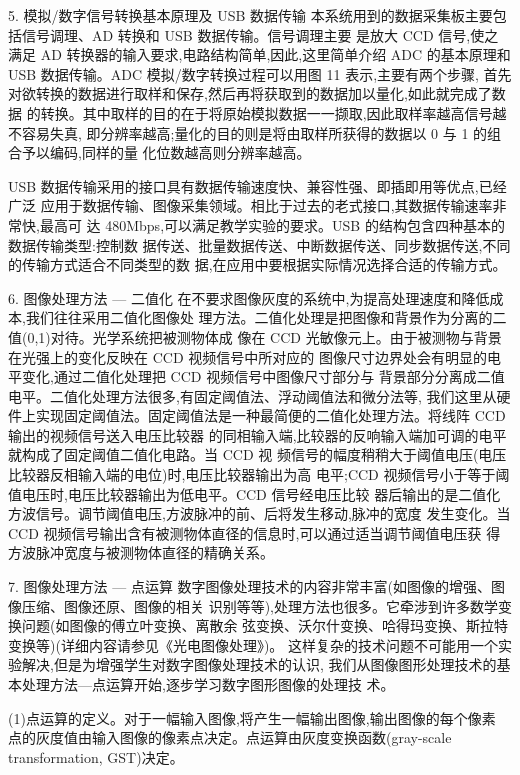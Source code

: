 \documentclass{ctexart}
\begin{document}
5. 模拟/数字信号转换基本原理及 USB 数据传输
本系统用到的数据采集板主要包括信号调理、AD 转换和 USB 数据传输。信号调理主要
是放大 CCD 信号,使之满足 AD 转换器的输入要求,电路结构简单,因此,这里简单介绍 ADC
的基本原理和 USB 数据传输。ADC 模拟/数字转换过程可以用图 11 表示,主要有两个步骤,
首先对欲转换的数据进行取样和保存,然后再将获取到的数据加以量化,如此就完成了数据
的转换。其中取样的目的在于将原始模拟数据一一撷取,因此取样率越高信号越不容易失真,
即分辨率越高;量化的目的则是将由取样所获得的数据以 0 与 1 的组合予以编码,同样的量
化位数越高则分辨率越高。

USB 数据传输采用的接口具有数据传输速度快、兼容性强、即插即用等优点,已经广泛
应用于数据传输、图像采集领域。相比于过去的老式接口,其数据传输速率非常快,最高可
达 480Mbps,可以满足教学实验的要求。USB 的结构包含四种基本的数据传输类型:控制数
据传送、批量数据传送、中断数据传送、同步数据传送,不同的传输方式适合不同类型的数
据,在应用中要根据实际情况选择合适的传输方式。

6. 图像处理方法 --- 二值化
在不要求图像灰度的系统中,为提高处理速度和降低成本,我们往往采用二值化图像处
理方法。二值化处理是把图像和背景作为分离的二值(0,1)对待。光学系统把被测物体成
像在 CCD 光敏像元上。由于被测物与背景在光强上的变化反映在 CCD 视频信号中所对应的
图像尺寸边界处会有明显的电平变化,通过二值化处理把 CCD 视频信号中图像尺寸部分与
背景部分分离成二值电平。二值化处理方法很多,有固定阈值法、浮动阈值法和微分法等,
我们这里从硬件上实现固定阈值法。固定阈值法是一种最简便的二值化处理方法。将线阵 CCD 输出的视频信号送入电压比较器
的同相输入端,比较器的反响输入端加可调的电平就构成了固定阈值二值化电路。当 CCD 视
频信号的幅度稍稍大于阈值电压(电压比较器反相输入端的电位)时,电压比较器输出为高
电平;CCD 视频信号小于等于阈值电压时,电压比较器输出为低电平。CCD 信号经电压比较
器后输出的是二值化方波信号。调节阈值电压,方波脉冲的前、后将发生移动,脉冲的宽度
发生变化。当 CCD 视频信号输出含有被测物体直径的信息时,可以通过适当调节阈值电压获
得方波脉冲宽度与被测物体直径的精确关系。

7. 图像处理方法 --- 点运算
数字图像处理技术的内容非常丰富(如图像的增强、图像压缩、图像还原、图像的相关
识别等等),处理方法也很多。它牵涉到许多数学变换问题(如图像的傅立叶变换、离散余
弦变换、沃尔什变换、哈得玛变换、斯拉特变换等)(详细内容请参见《光电图像处理》)。
这样复杂的技术问题不可能用一个实验解决,但是为增强学生对数字图像处理技术的认识,
我们从图像图形处理技术的基本处理方法—点运算开始,逐步学习数字图形图像的处理技
术。

(1)点运算的定义。对于一幅输入图像,将产生一幅输出图像,输出图像的每个像素
点的灰度值由输入图像的像素点决定。点运算由灰度变换函数(gray-scale transformation,
GST)决定。
\end{document}

